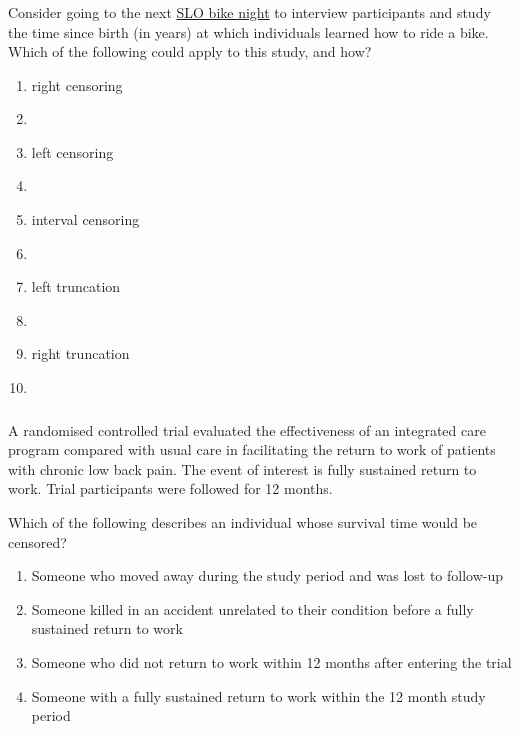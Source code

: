 \begin{frame}
\frametitle{\grp}
\begin{clicker}{Consider going to the next \href{http://bikehappening.org/?page_id=4}{SLO bike night} to interview participants and study the time since birth (in years) at which individuals learned how to ride a bike.  Which of the following could apply to this study, and how?}
\begin{enumerate}
\item right censoring %
\item[]
\item left censoring  %
\item[]
\item interval censoring %
\item[]
\item left truncation %
\item[]
\item right truncation %
\item[]
\end{enumerate}
\end{clicker}
\end{frame}


\begin{frame}
\frametitle{\grp}
A randomised controlled trial evaluated the effectiveness of an integrated care program compared with usual care in facilitating the return to work of patients with chronic low back pain. The event of interest is fully sustained return to work.  Trial participants were followed for 12 months.
\begin{clicker}{Which of the following describes an individual whose survival time would be censored?}
\begin{enumerate}
\item Someone who moved away during the study period and was lost to follow-up
\item Someone killed in an accident unrelated to their condition before a fully sustained return to work
\item Someone who did not return to work within 12 months after entering the trial
\item Someone with a fully sustained return to work within the 12 month study period
\end{enumerate}
\end{clicker}
\end{frame}

